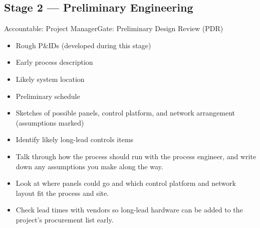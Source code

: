 \subsection{Stage 2 --- Preliminary Engineering}
\begin{stagecard}{Accountable: Project Manager}{Gate: Preliminary Design Review (PDR)}
\tcbline
\begin{minipage}[t]{0.485\linewidth}
\begin{itemize}[leftmargin=*,itemsep=1pt,topsep=2pt]
  \item Rough P\&IDs (developed during this stage)
  \item Early process description
  \item Likely system location
  \item Preliminary schedule
\end{itemize}
\end{minipage}\hfill
\begin{minipage}[t]{0.485\linewidth}
\begin{itemize}[leftmargin=*,itemsep=1pt,topsep=2pt]
  \item Sketches of possible panels, control platform, and network arrangement (assumptions marked)
  \item Identify likely long-lead controls items
\end{itemize}
\end{minipage}
\tcbline
{}
\begin{itemize}[leftmargin=*,itemsep=1pt,topsep=2pt]
  \item Talk through how the process should run with the process engineer, and write down any assumptions you make along the way.
  \item Look at where panels could go and which control platform and network layout fit the process and site.
  \item Check lead times with vendors so long-lead hardware can be added to the project's procurement list early.

\end{itemize}
\end{stagecard}
